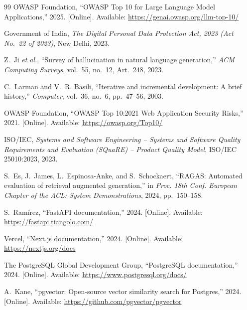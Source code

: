 \documentclass[11pt,a4paper,oneside]{report}
\begin{document}
\begin{thebibliography}{99}
OWASP Foundation, ``OWASP Top 10 for Large Language Model Applications,'' 2025. [Online].
Available: \url{https://genai.owasp.org/llm-top-10/}

Government of India, \emph{The Digital Personal Data Protection Act, 2023 (Act No.~22 of
2023)}, New Delhi, 2023.

Z.~Ji \emph{et al.}, ``Survey of hallucination in natural language generation,''
\emph{ACM Computing Surveys}, vol.~55, no.~12, Art.~248, 2023.

C.~Larman and V.~R. Basili, ``Iterative and incremental development: A brief history,''
\emph{Computer}, vol.~36, no.~6, pp.~47--56, 2003.

OWASP Foundation, ``OWASP Top 10:2021 Web Application Security Risks,'' 2021. [Online].
Available: \url{https://owasp.org/Top10/}

ISO/IEC, \emph{Systems and Software Engineering -- Systems and Software Quality Requirements
and Evaluation (SQuaRE) -- Product Quality Model}, ISO/IEC 25010:2023, 2023.

S.~Es, J.~James, L.~Espinosa-Anke, and S.~Schockaert, ``RAGAS: Automated evaluation of
retrieval augmented generation,'' in \emph{Proc. 18th Conf. European Chapter of the ACL:
System Demonstrations}, 2024, pp.~150--158.

S.~Ram\'irez, ``FastAPI documentation,'' 2024. [Online]. Available:
\url{https://fastapi.tiangolo.com/}

Vercel, ``Next.js documentation,'' 2024. [Online]. Available: \url{https://nextjs.org/docs}

The PostgreSQL Global Development Group, ``PostgreSQL documentation,'' 2024. [Online].
Available: \url{https://www.postgresql.org/docs/}

A.~Kane, ``pgvector: Open-source vector similarity search for Postgres,'' 2024. [Online].
Available: \url{https://github.com/pgvector/pgvector}

\end{thebibliography}
\end{document}
